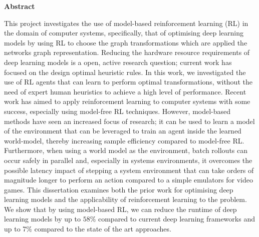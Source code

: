 \newpage
{\Huge \bf Abstract}
\vspace{24pt} 

This project investigates the use of model-based reinforcement learning (RL) in the domain of computer systems, specifically, that of optimising deep learning models by using RL to choose the graph transformations which are applied the networks graph representation. Reducing the hardware resource requirements of deep learning models is a open, active research question; current work has focused on the design optimal heuristic rules. In this work, we investigated the use of RL agents that can learn to perform optimal transformations, without the need of expert human heuristics to achieve a high level of performance. Recent work has aimed to apply reinforcement learning to computer systems with some success, especially using model-free RL techniques. However, model-based methods have seen an increased focus of research; it can be used to learn a model of the environment that can be leveraged to train an agent inside the learned world-model, thereby increasing sample efficiency compared to model-free RL. Furthermore, when using a world model as the environment, batch rollouts can occur safely in parallel and, especially in systems environments, it overcomes the possible latency impact of stepping a system environment that can take orders of magnitude longer to perform an action compared to a simple emulators for video games. This dissertation examines both the prior work for optimising deep learning models and the applicability of reinforcement learning to the problem. We show that by using model-based RL, we can reduce the runtime of deep learning models by up to $58\%$ compared to current deep learning frameworks and up to 7\% compared to the state of the art approaches.

\vspace*{\fill}
